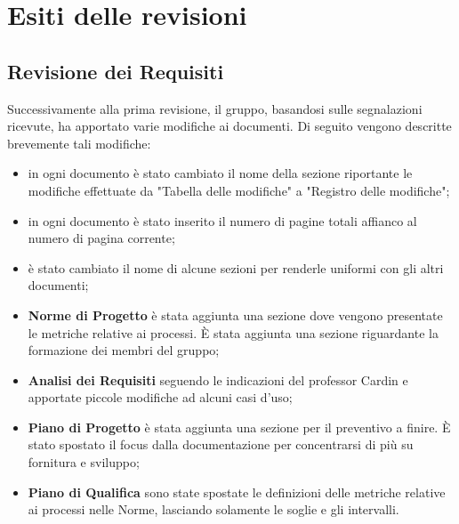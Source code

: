 \section{Esiti delle revisioni}
	\subsection{Revisione dei Requisiti}
	Successivamente alla prima revisione, il gruppo, basandosi sulle 
	segnalazioni ricevute, ha apportato varie modifiche ai documenti. 
	Di seguito vengono descritte brevemente tali modifiche:
	\begin{itemize}
		\item in ogni documento è stato cambiato il nome della sezione 
		riportante le modifiche effettuate da "Tabella delle modifiche" a 
		"Registro delle modifiche";
		\item in ogni documento è stato inserito il numero di pagine totali 
		affianco al numero di pagina corrente;
		\item è stato cambiato il nome di alcune sezioni per renderle uniformi 
		con gli altri documenti;
		\item \textbf{Norme di Progetto} è stata aggiunta una sezione dove 
		vengono presentate le metriche relative ai processi. È stata aggiunta
		 una sezione riguardante la formazione dei membri del gruppo;
		\item \textbf{Analisi dei Requisiti} seguendo le indicazioni del 
		professor Cardin e apportate piccole modifiche ad alcuni casi d'uso;
		\item \textbf{Piano di Progetto} è stata aggiunta una sezione per il 
		preventivo a finire. È stato spostato il focus dalla documentazione per concentrarsi di più su fornitura e sviluppo; %
		\item \textbf{Piano di Qualifica} sono state spostate le definizioni 
		delle metriche relative ai processi nelle Norme, lasciando solamente 
		le soglie e gli intervalli.
	\end{itemize}
	